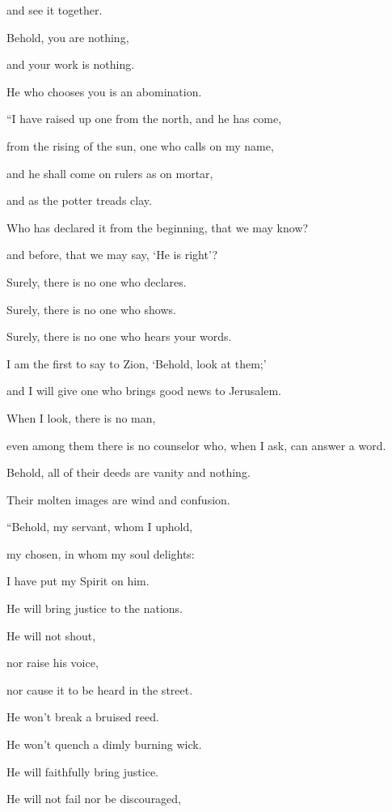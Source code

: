 and see it together.

\myverse{}Behold, you are nothing,

and your work is nothing.

He who chooses you is an abomination.


\vspace{\baselineskip} \myverse{}“I have raised up one from the north, and he has come,

from the rising of the sun, one who calls on my name,

and he shall come on rulers as on mortar,

and as the potter treads clay.

\myverse{}Who has declared it from the beginning, that we may know?

and before, that we may say, ‘He is right’?

Surely, there is no one who declares.

Surely, there is no one who shows.

Surely, there is no one who hears your words.

\myverse{}I am the first to say to Zion, ‘Behold, look at them;’

and I will give one who brings good news to Jerusalem.

\myverse{}When I look, there is no man,

even among them there is no counselor who, when I ask, can answer a word.

\myverse{}Behold, all of their deeds are vanity and nothing.

Their molten images are wind and confusion.


\mychapter{} \myverse*{}“Behold, my servant, whom I uphold,

\quad\quad my chosen, in whom my soul delights:

I have put my Spirit on him.

He will bring justice to the nations.

\myverse{}He will not shout,

nor raise his voice,

nor cause it to be heard in the street.

\myverse{}He won’t break a bruised reed.

He won’t quench a dimly burning wick.

He will faithfully bring justice.

\myverse{}He will not fail nor be discouraged,

